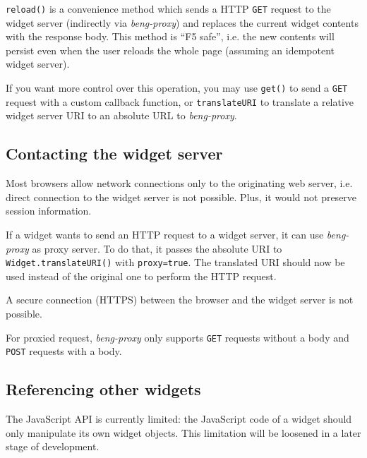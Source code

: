 \documentclass[a4paper,12pt]{article}
\begin{document}
\texttt{reload()} is a convenience method which sends a HTTP
\texttt{GET} request to the widget server (indirectly via
\emph{beng-proxy}) and replaces the current widget contents with the
response body.  This method is ``F5 safe'', i.e. the new contents will
persist even when the user reloads the whole page (assuming an
idempotent widget server).

If you want more control over this operation, you may use
\texttt{get()} to send a \texttt{GET} request with a custom callback
function, or \texttt{translateURI} to translate a relative widget
server URI to an absolute URL to \emph{beng-proxy}.


\subsection{Contacting the widget server}

Most browsers allow network connections only to the originating web
server, i.e. direct connection to the widget server is not possible.
Plus, it would not preserve session information.

If a widget wants to send an HTTP request to a widget server, it can
use \emph{beng-proxy} as proxy server.  To do that, it passes the
absolute URI to \texttt{Widget.translateURI()} with
\texttt{proxy=true}.  The translated URI should now be used instead of
the original one to perform the HTTP request.

A secure connection (HTTPS) between the browser and the widget server
is not possible.

For proxied request, \emph{beng-proxy} only supports \texttt{GET}
requests without a body and \texttt{POST} requests with a body.


\subsection{Referencing other widgets}

The JavaScript API is currently limited: the JavaScript code of a
widget should only manipulate its own widget objects.  This limitation
will be loosened in a later stage of development.
\end{document}
